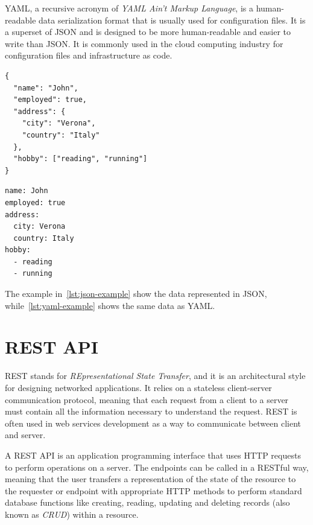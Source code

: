 YAML, a recursive acronym of \textit{YAML Ain't Markup Language}, is a human-readable data serialization format that is usually used for configuration files. It is a superset of JSON and is designed to be more human-readable and easier to write than JSON. It is commonly used in the cloud computing industry for configuration files and infrastructure as code.

\begin{minipage}{\linewidth}
  \begin{lstlisting}[style=json, caption={JSON example}, label={lst:json-example}]
{
  "name": "John",
  "employed": true,
  "address": {
    "city": "Verona",
    "country": "Italy"
  },
  "hobby": ["reading", "running"]
}
  \end{lstlisting}
\end{minipage}

\begin{minipage}{\linewidth}
  \begin{lstlisting}[style=yaml, caption={YAML example}, label={lst:yaml-example}]
name: John
employed: true
address:
  city: Verona
  country: Italy
hobby:
  - reading
  - running
  \end{lstlisting}
\end{minipage}

The example in~\cref{lst:json-example} show the data represented in JSON, while~\cref{lst:yaml-example} shows the same data as YAML.

\section{REST API}

REST stands for \textit{REpresentational State Transfer}, and it is an architectural style for designing networked applications. It relies on a stateless client-server communication protocol, meaning that each request from a client to a server must contain all the information necessary to understand the request. REST is often used in web services development as a way to communicate between client and server.

A REST API is an application programming interface that uses HTTP requests to perform operations on a server. The endpoints can be called in a RESTful way, meaning that the user transfers a representation of the state of the resource to the requester or endpoint with appropriate HTTP methods to perform standard database functions like creating, reading, updating and deleting records (also known as \textit{CRUD}) within a resource.~\cite{rest-api}

